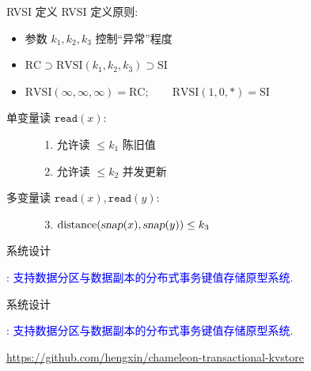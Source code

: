 \begin{frame}{RVSI 定义}
  RVSI 定义原则:
  \begin{itemize}
    \item 参数 $k_1, k_2, k_3$ 控制``异常''程度
    \item $\text{RC} \supset \text{RVSI}(k_1, k_2, k_3) \supset \text{SI}$
    \item $\text{RVSI}(\infty,\infty,\infty) = \text{RC}; \qquad \text{RVSI}(1,0,\ast) = \text{SI}$
  \end{itemize}

  \vspace{0.20cm}

  \begin{cdef}
    \begin{description}
      \item[单变量读 $\texttt{read}(x)$:] \hfill 
        \begin{enumerate}
          \item 允许读 $\le k_1$ 陈旧值
          \item 允许读 $\le k_2$ 并发更新
        \end{enumerate}
      \item[多变量读 $\texttt{read}(x), \texttt{read}{(y)}$:] \hfill
        \begin{enumerate}
          \setcounter{enumi}{2}
		\item $\text{distance}(\textsl{snap}{(x)},\textsl{snap}{(y)}) \le k_3$
        \end{enumerate}
    \end{description}
  \end{cdef}
\end{frame}
\begin{frame}{\chameleon{} 系统设计}
  \centerline{\textcolor{blue}{\chameleon{}: 
	支持数据分区与数据副本的分布式事务键值存储原型系统.}}

\end{frame}
\begin{frame}{\chameleon{} 系统设计}
  \centerline{\textcolor{blue}{\chameleon{}: 
	支持数据分区与数据副本的分布式事务键值存储原型系统.}}

\end{frame}
\begin{frame}{}

  \textcolor{red}{\small \url{https://github.com/hengxin/chameleon-transactional-kvstore}}
\end{frame}
